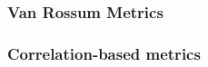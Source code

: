 
\subsubsection{Van Rossum Metrics}


\subsubsection{Correlation-based metrics}







\newpage























